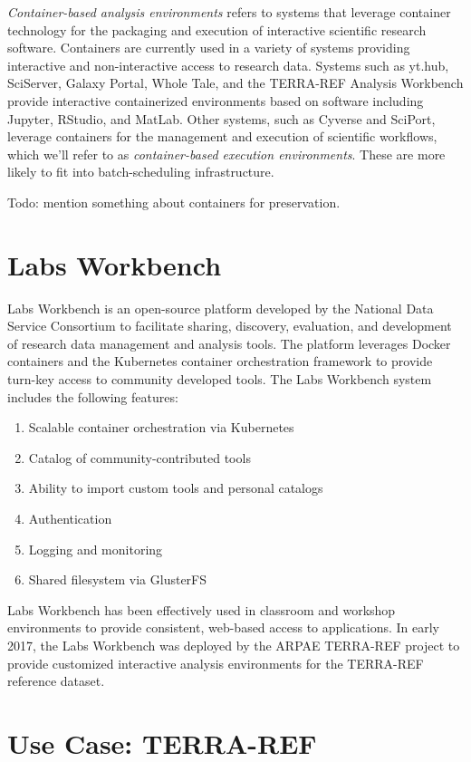 \documentclass{sig-alternate}
\begin{document}
\emph{Container-based analysis environments} refers to systems that leverage container technology for the packaging and execution of interactive scientific research software. Containers are currently used in a variety of systems providing interactive and non-interactive access to research data. Systems such as yt.hub, SciServer, Galaxy Portal, Whole Tale, and the TERRA-REF Analysis Workbench provide interactive containerized environments based on software including Jupyter, RStudio, and MatLab. Other systems, such as Cyverse and SciPort\cite{Gerlach:2014:SCE:2689676.2689680}, leverage containers for the management and execution of scientific workflows, which we'll refer to as \emph{container-based execution environments}.  These are more likely to fit into batch-scheduling infrastructure.

Todo: mention something about containers for preservation.

\section{Labs Workbench}

Labs Workbench is an open-source platform developed by the National Data Service Consortium to facilitate sharing, discovery, evaluation, and development of research data management and analysis tools. The platform leverages Docker containers and the Kubernetes container orchestration framework to provide turn-key access to community developed tools. 
The Labs Workbench system includes the following features:
\begin{enumerate}
\itemsep-0.2em
\item Scalable container orchestration via Kubernetes
\item Catalog of community-contributed tools
\item Ability to import custom tools and personal catalogs
\item Authentication
\item Logging and monitoring
\item Shared filesystem via GlusterFS
\end{enumerate}

Labs Workbench has been effectively used in classroom and workshop environments to provide consistent, web-based access to applications. In early 2017, the Labs Workbench was deployed by the ARPAE TERRA-REF project to provide customized interactive analysis environments for the TERRA-REF reference dataset. 

\section{Use Case: TERRA-REF}
\end{document}
